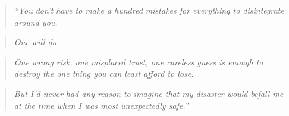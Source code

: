 \cleartooddpage[\thispagestyle{empty}]
\thispagestyle{empty}
\begin{vplace}[0.7]
\begin{quote}
\emph{``You don't have to make a hundred mistakes for everything to disintegrate
around you.}
\end{quote}

\begin{quote}
\emph{One will do.}
\end{quote}

\begin{quote}
\emph{One wrong risk, one misplaced trust, one careless guess is enough to
destroy the one thing you can least afford to lose.}
\end{quote}

\begin{quote}
\emph{But I'd never had any reason to imagine that my disaster would befall me
at the time when I was most unexpectedly safe.''}
\end{quote}
\end{vplace}

\clearpage
